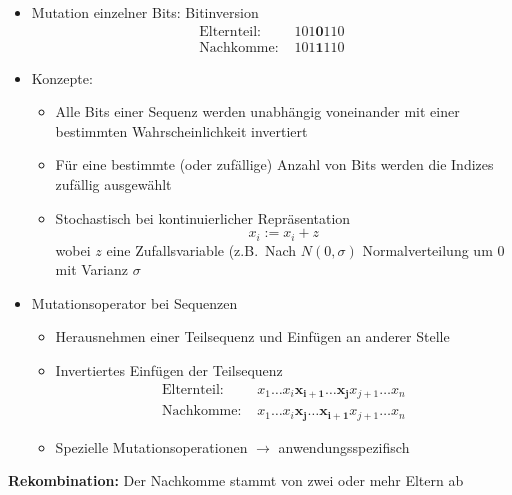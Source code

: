 \begin{itemize}
	\item Mutation einzelner Bits: Bitinversion
	\begin{align*}
		\text{Elternteil: } & 101\textbf{0}110 \\
		\text{Nachkomme: } & 101\textbf{1}110
	\end{align*}
	\item Konzepte:
	\begin{itemize}
		\item Alle Bits einer Sequenz werden unabhängig voneinander mit einer bestimmten Wahrscheinlichkeit invertiert
		\item Für eine bestimmte (oder zufällige) Anzahl von Bits werden die Indizes zufällig ausgewählt
		\item Stochastisch bei kontinuierlicher Repräsentation
		\begin{equation*}
			x_i := x_i + z
		\end{equation*}
		wobei $z$ eine Zufallsvariable  (z.B.\ Nach $N(0,\sigma)$ Normalverteilung um $0$ mit Varianz $\sigma$		
	\end{itemize}
	\item Mutationsoperator bei Sequenzen
	\begin{itemize}
		\item Herausnehmen einer Teilsequenz und Einfügen an anderer Stelle
		\item Invertiertes Einfügen der Teilsequenz
		\begin{align*}
			\text{Elternteil: } & x_1 \hdots x_i \mathbf{x_{i+1}} \hdots \mathbf{x_j} x_{j+1} \hdots x_n \\
			\text{Nachkomme: } & x_1 \hdots x_i \mathbf{x_j} \hdots \mathbf{x_{i+1}} x_{j+1} \hdots x_n
		\end{align*}
		\item Spezielle Mutationsoperationen $\rightarrow$ anwendungsspezifisch
	\end{itemize}
\end{itemize}
%
\textbf{Rekombination:} Der Nachkomme stammt von zwei oder mehr Eltern ab
